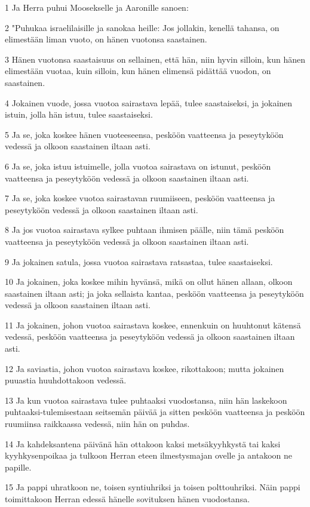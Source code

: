 \par 1 Ja Herra puhui Moosekselle ja Aaronille sanoen:
\par 2 "Puhukaa israelilaisille ja sanokaa heille: Jos jollakin, kenellä tahansa, on elimestään liman vuoto, on hänen vuotonsa saastainen.
\par 3 Hänen vuotonsa saastaisuus on sellainen, että hän, niin hyvin silloin, kun hänen elimestään vuotaa, kuin silloin, kun hänen elimensä pidättää vuodon, on saastainen.
\par 4 Jokainen vuode, jossa vuotoa sairastava lepää, tulee saastaiseksi, ja jokainen istuin, jolla hän istuu, tulee saastaiseksi.
\par 5 Ja se, joka koskee hänen vuoteeseensa, pesköön vaatteensa ja peseytyköön vedessä ja olkoon saastainen iltaan asti.
\par 6 Ja se, joka istuu istuimelle, jolla vuotoa sairastava on istunut, pesköön vaatteensa ja peseytyköön vedessä ja olkoon saastainen iltaan asti.
\par 7 Ja se, joka koskee vuotoa sairastavan ruumiiseen, pesköön vaatteensa ja peseytyköön vedessä ja olkoon saastainen iltaan asti.
\par 8 Ja jos vuotoa sairastava sylkee puhtaan ihmisen päälle, niin tämä pesköön vaatteensa ja peseytyköön vedessä ja olkoon saastainen iltaan asti.
\par 9 Ja jokainen satula, jossa vuotoa sairastava ratsastaa, tulee saastaiseksi.
\par 10 Ja jokainen, joka koskee mihin hyvänsä, mikä on ollut hänen allaan, olkoon saastainen iltaan asti; ja joka sellaista kantaa, pesköön vaatteensa ja peseytyköön vedessä ja olkoon saastainen iltaan asti.
\par 11 Ja jokainen, johon vuotoa sairastava koskee, ennenkuin on huuhtonut kätensä vedessä, pesköön vaatteensa ja peseytyköön vedessä ja olkoon saastainen iltaan asti.
\par 12 Ja saviastia, johon vuotoa sairastava koskee, rikottakoon; mutta jokainen puuastia huuhdottakoon vedessä.
\par 13 Ja kun vuotoa sairastava tulee puhtaaksi vuodostansa, niin hän laskekoon puhtaaksi-tulemisestaan seitsemän päivää ja sitten pesköön vaatteensa ja pesköön ruumiinsa raikkaassa vedessä, niin hän on puhdas.
\par 14 Ja kahdeksantena päivänä hän ottakoon kaksi metsäkyyhkystä tai kaksi kyyhkysenpoikaa ja tulkoon Herran eteen ilmestysmajan ovelle ja antakoon ne papille.
\par 15 Ja pappi uhratkoon ne, toisen syntiuhriksi ja toisen polttouhriksi. Näin pappi toimittakoon Herran edessä hänelle sovituksen hänen vuodostansa.
